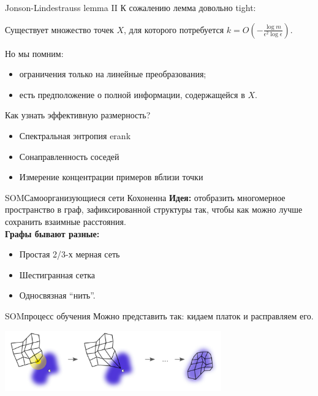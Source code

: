 \documentclass[14pt, fleqn, xcolor={dvipsnames, table}]{beamer}
\begin{document}
\begin{frame}{Jonson-Lindestrauss lemma II}
К сожалению лемма довольно tight:
\begin{theorem}{}
Существует множество точек $X$, для которого потребуется $k = O(-\frac{\log m}{\epsilon^2 \log \epsilon})$.
\end{theorem}
Но мы помним:
\begin{itemize}
  \item ограничения только на линейные преобразования;
  \item есть предположение о полной информации, содержащейся в $X$.
\end{itemize}
\end{frame}

\begin{frame}{Как узнать эффективную размерность?}
\begin{itemize}
  \item Спектральная энтропия erank
  \item Сонаправленность соседей
  \item Измерение концентрации примеров вблизи точки
\end{itemize}
\end{frame}

\begin{frame}{SOM}{Самоорганизующиеся сети Кохоненна}
\textbf{Идея:} отобразить многомерное пространство в граф, зафиксированной структуры так, чтобы как можно лучше сохранить взаимные расстояния. \\
\textbf{Графы бывают разные:}
\begin{itemize}
  \item Простая 2/3-х мерная сеть
  \item Шестигранная сетка
  \item Односвязная “нить”.
\end{itemize}
\end{frame}

\begin{frame}{SOM}{процесс обучения}
Можно представить так: кидаем платок и расправляем его.
\begin{center}\includegraphics[width=0.7\textwidth]{SOM.png}\end{center}
\end{frame}
\end{document}
